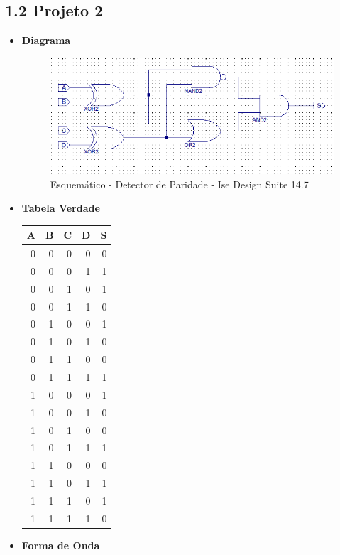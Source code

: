 \documentclass[12pts]{article}
\begin{document}
\newpage
\subsection{1.2 Projeto 2}

\begin{itemize}
	\item \textbf{Diagrama}

\begin{figure}[!htb]
  \centering
  \includegraphics[scale=0.5]{imagens/parImpar}
  \caption{Esquemático - Detector de Paridade - Ise Design Suite 14.7}
  \label{figRotulo}
\end{figure}		
	
	\item \textbf{Tabela Verdade}
\begin{center}
	\begin{tabular}{|r|r|r|r|r|}
		\hline
		A & B & C & D & S \\
		\hline
		0 & 0 & 0 & 0 & 0 \\
		\hline
		0 & 0 & 0 & 1 & 1 \\
		\hline
		0 & 0 & 1 & 0 & 1 \\
		\hline
		0 & 0 & 1 & 1 & 0 \\
		\hline
		0 & 1 & 0 & 0 & 1 \\
		\hline
		0 & 1 & 0 & 1 & 0 \\
		\hline
		0 & 1 & 1 & 0 & 0 \\
		\hline
		0 & 1 & 1 & 1 & 1 \\
		\hline
		1 & 0 & 0 & 0 & 1 \\
		\hline
		1 & 0 & 0 & 1 & 0 \\
		\hline
		1 & 0 & 1 & 0 & 0 \\
		\hline
		1 & 0 & 1 & 1 & 1 \\
		\hline
		1 & 1 & 0 & 0 & 0 \\
		\hline
		1 & 1 & 0 & 1 & 1 \\
		\hline
		1 & 1 & 1 & 0 & 1 \\
		\hline
		1 & 1 & 1 & 1 & 0 \\
		\hline
	\end{tabular}
\end{center}
\newpage
	\item \textbf{Forma de Onda}	


\end{itemize}
\end{document}
